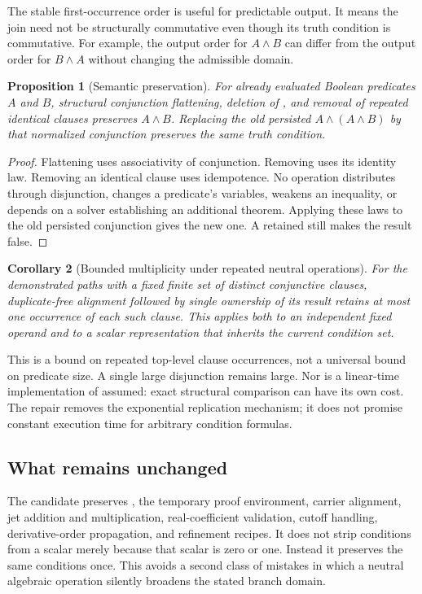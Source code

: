 \documentclass[11pt,a4paper]{article}
\newcommand{\code}[1]{\texttt{\detokenize{#1}}}
\newtheorem{proposition}{Proposition}[section]
\newtheorem{corollary}[proposition]{Corollary}
\begin{document}
The stable first-occurrence order is useful for predictable output. It means the join need not be structurally commutative even though its truth condition is commutative. For example, the output order for $A\land B$ can differ from the output order for $B\land A$ without changing the admissible domain.

\begin{proposition}[Semantic preservation]
For already evaluated Boolean predicates $A$ and $B$, structural conjunction flattening, deletion of \code{True}, and removal of repeated identical clauses preserves $A\land B$. Replacing the old persisted $A\land(A\land B)$ by that normalized conjunction preserves the same truth condition.
\end{proposition}
\begin{proof}
Flattening uses associativity of conjunction. Removing \code{True} uses its identity law. Removing an identical clause uses idempotence. No operation distributes through disjunction, changes a predicate's variables, weakens an inequality, or depends on a solver establishing an additional theorem. Applying these laws to the old persisted conjunction gives the new one. A retained \code{False} still makes the result false.
\end{proof}

\begin{corollary}[Bounded multiplicity under repeated neutral operations]
For the demonstrated paths with a fixed finite set of distinct conjunctive clauses, duplicate-free alignment followed by single ownership of its result retains at most one occurrence of each such clause. This applies both to an independent fixed operand and to a scalar representation that inherits the current condition set.
\end{corollary}

This is a bound on repeated top-level clause occurrences, not a universal bound on predicate size. A single large disjunction remains large. Nor is a linear-time implementation of \code{DeleteDuplicates} assumed: exact structural comparison can have its own cost. The repair removes the exponential replication mechanism; it does not promise constant execution time for arbitrary condition formulas.

\subsection{What remains unchanged}
The candidate preserves \code{seriesCompatible}, the temporary proof environment, carrier alignment, jet addition and multiplication, real-coefficient validation, cutoff handling, derivative-order propagation, and refinement recipes. It does not strip conditions from a scalar merely because that scalar is zero or one. Instead it preserves the same conditions once. This avoids a second class of mistakes in which a neutral algebraic operation silently broadens the stated branch domain.
\end{document}
